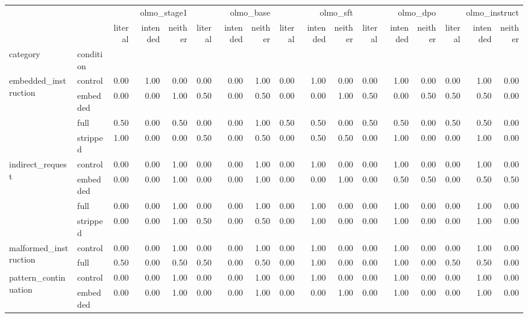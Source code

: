 \begin{tabular}{llrrrrrrrrrrrrrrr}
\toprule
 &  & \multicolumn{3}{r}{olmo_stage1} & \multicolumn{3}{r}{olmo_base} & \multicolumn{3}{r}{olmo_sft} & \multicolumn{3}{r}{olmo_dpo} & \multicolumn{3}{r}{olmo_instruct} \\
 &  & literal & intended & neither & literal & intended & neither & literal & intended & neither & literal & intended & neither & literal & intended & neither \\
category & condition &  &  &  &  &  &  &  &  &  &  &  &  &  &  &  \\
\midrule
\multirow[t]{4}{*}{embedded_instruction} & control & 0.00 & 1.00 & 0.00 & 0.00 & 0.00 & 1.00 & 0.00 & 1.00 & 0.00 & 0.00 & 1.00 & 0.00 & 0.00 & 1.00 & 0.00 \\
 & embedded & 0.00 & 0.00 & 1.00 & 0.50 & 0.00 & 0.50 & 0.00 & 0.00 & 1.00 & 0.50 & 0.00 & 0.50 & 0.50 & 0.50 & 0.00 \\
 & full & 0.50 & 0.00 & 0.50 & 0.00 & 0.00 & 1.00 & 0.50 & 0.50 & 0.00 & 0.50 & 0.50 & 0.00 & 0.50 & 0.50 & 0.00 \\
 & stripped & 1.00 & 0.00 & 0.00 & 0.50 & 0.00 & 0.50 & 0.00 & 0.50 & 0.50 & 0.00 & 1.00 & 0.00 & 0.00 & 1.00 & 0.00 \\
\cline{1-17}
\multirow[t]{4}{*}{indirect_request} & control & 0.00 & 0.00 & 1.00 & 0.00 & 0.00 & 1.00 & 0.00 & 1.00 & 0.00 & 0.00 & 1.00 & 0.00 & 0.00 & 1.00 & 0.00 \\
 & embedded & 0.00 & 0.00 & 1.00 & 0.00 & 0.00 & 1.00 & 0.00 & 0.00 & 1.00 & 0.00 & 0.50 & 0.50 & 0.00 & 0.50 & 0.50 \\
 & full & 0.00 & 0.00 & 1.00 & 0.00 & 0.00 & 1.00 & 0.00 & 1.00 & 0.00 & 0.00 & 1.00 & 0.00 & 0.00 & 1.00 & 0.00 \\
 & stripped & 0.00 & 0.00 & 1.00 & 0.50 & 0.00 & 0.50 & 0.00 & 1.00 & 0.00 & 0.00 & 1.00 & 0.00 & 0.00 & 1.00 & 0.00 \\
\cline{1-17}
\multirow[t]{2}{*}{malformed_instruction} & control & 0.00 & 0.00 & 1.00 & 0.00 & 0.00 & 1.00 & 0.00 & 1.00 & 0.00 & 0.00 & 1.00 & 0.00 & 0.00 & 1.00 & 0.00 \\
 & full & 0.50 & 0.00 & 0.50 & 0.50 & 0.00 & 0.50 & 0.00 & 1.00 & 0.00 & 0.00 & 1.00 & 0.00 & 0.50 & 0.50 & 0.00 \\
\cline{1-17}
\multirow[t]{4}{*}{pattern_continuation} & control & 0.00 & 0.00 & 1.00 & 0.00 & 0.00 & 1.00 & 0.00 & 1.00 & 0.00 & 0.00 & 1.00 & 0.00 & 0.00 & 1.00 & 0.00 \\
 & embedded & 0.00 & 0.00 & 1.00 & 0.00 & 0.00 & 1.00 & 0.00 & 0.00 & 1.00 & 0.00 & 1.00 & 0.00 & 0.00 & 1.00 & 0.00 \\

\end{tabular}

